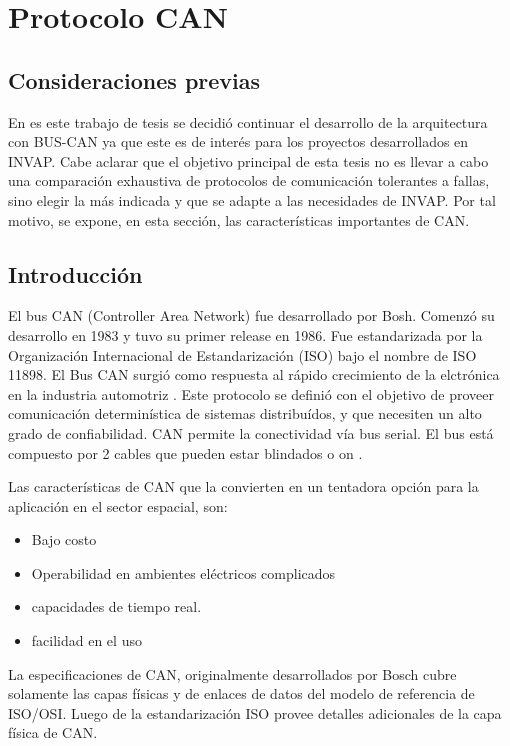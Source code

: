 \section{Protocolo CAN}
\subsection{Consideraciones previas}
En es este trabajo de tesis se decidió continuar el desarrollo de la arquitectura con BUS-CAN ya que este es de interés para los proyectos desarrollados en INVAP. Cabe aclarar que el objetivo principal de esta tesis no es llevar a cabo una comparación exhaustiva de protocolos de comunicación tolerantes a fallas, sino elegir la más indicada y que se adapte a las necesidades de INVAP. Por tal motivo, se expone, en esta sección, las características importantes de CAN.

\subsection{Introducción}
El bus CAN (Controller Area Network) fue desarrollado por Bosh. Comenzó su desarrollo en 1983 y tuvo su primer release en 1986. Fue estandarizada por la Organización Internacional de Estandarización (ISO) bajo el nombre de  ISO 11898. El Bus CAN surgió como respuesta al rápido crecimiento de la elctrónica en la industria automotriz \citep{esdWEB}. Este protocolo se definió con el objetivo de proveer comunicación determinística de sistemas distribuídos, y que necesiten un alto grado de confiabilidad. CAN permite la conectividad vía bus serial. El bus está compuesto por  2 cables que pueden estar blindados o on \citep{esdWEB}.

Las características de CAN que la convierten en un tentadora opción para la aplicación en el sector espacial, son:
\begin{itemize}
  \item Bajo costo
  \item Operabilidad en ambientes eléctricos complicados
  \item capacidades de tiempo real.
  \item facilidad en el uso
\end{itemize}

La especificaciones de CAN, originalmente desarrollados por Bosch cubre solamente las capas físicas y de enlaces de datos del modelo de referencia de ISO/OSI. Luego de la estandarización ISO provee detalles adicionales de la capa física de CAN.

